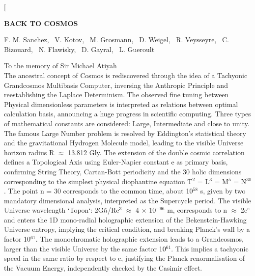 \documentclass[twoside,draft]{article}
\begin{document}
\begin{sloppypar}

\renewcommand{\refname}{References}
\renewcommand{\tablename}{\small Table}
\renewcommand{\figurename}{\small Fig.}
\renewcommand{\contentsname}{Contents}


\twocolumn[%
\begin{center}
\renewcommand{\baselinestretch}{0.93}
{\Large\bfseries BACK TO COSMOS

}\par
\renewcommand{\baselinestretch}{1.0}
\bigskip
F. M. Sanchez, \ V. Kotov, \ M. Grosmann, \ D. Weigel, \ R. Veysseyre, \ C. Bizouard, \ N. Flawisky, \ D. Gayral, \ L. Gueroult\\
\par
\medskip
{\small\parbox{11cm}{%
To the memory of Sir Michael Atiyah\\
The ancestral concept of Cosmos is rediscovered through the idea of a Tachyonic Grandcosmos Multibasis Computer, inversing the Anthropic Principle and reestablishing the Laplace Determinism.
The observed fine tuning between Physical dimensionless parameters is interpreted as relations between optimal calculation basis, announcing a huge progress in scientific computing.
Three types of mathematical constants are considered: Large, Intermediate and close to unity. The famous Large Number problem is resolved by Eddington's statistical theory and the gravitational Hydrogen Molecule model, leading to the visible Universe horizon radius R $\approx$ 13.812 Gly.
The extension of the double cosmic correlation defines a Topological Axis using Euler-Napier constant e as primary basis, confirming String Theory, Cartan-Bott periodicity and the 30 holic dimensions corresponding to the simplest physical diophantine equation T$^2\!$ = L$^3\!$ = M$^5\!$ = N$^{30}\!$.
The point n = 30 corresponds to the common time, about 10$^{58}\!$ s, given by two mandatory dimensional analysis, interpreted as the Supercycle period.
The visible Universe wavelength `Topon`: 2G$\hbar$/Rc$^3\!$ $\approx$ 4 $\times$ 10$^{-96}\!$ m, corresponds to n $\approx$ 2e$^e\!$ and enters the 1D mono-radial holographic extension of the Bekenstein-Hawking Universe entropy, implying the critical condition, and breaking Planck's wall by a factor 10$^{61}\!$.
The monochromatic holographic extension leads to a Grandcosmos, larger than the visible Universe by the same factor 10$^{61}\!$.
This implies a tachyonic speed in the same ratio by respect to c, justifying the Planck renormalisation of the Vacuum Energy, independently checked by the Casimir effect.
}}
\end{center}
\end{sloppypar}
\end{document}
